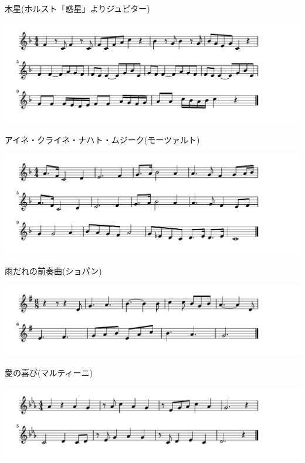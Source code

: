 \documentclass[a4paper]{ltjsarticle}
\begin{document}
\vspace{-10mm} \hspace{10mm}
木星(ホルスト「惑星」よりジュピター)

\includegraphics[clip]{eineclinenacht_crop.pdf}

\vspace{-10mm} \hspace{10mm}
アイネ・クライネ・ナハト・ムジーク(モーツァルト)

\includegraphics[clip]{amadare_crop.pdf}

\vspace{-10mm} \hspace{10mm}
雨だれの前奏曲(ショパン)

\includegraphics[clip]{ainoyorokobi_crop.pdf}

\vspace{-10mm} \hspace{10mm}
愛の喜び(マルティーニ)

\includegraphics[clip]{edokomori_crop.pdf}
\end{document}
